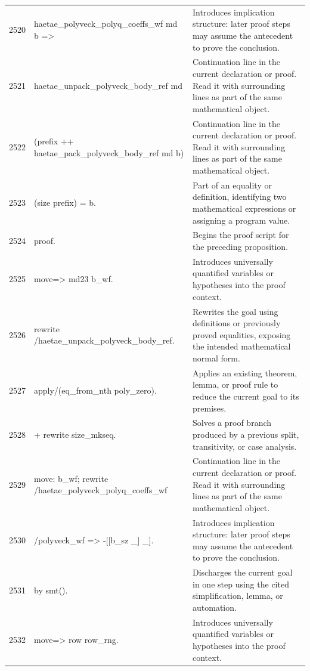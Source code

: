 \documentclass[10pt]{article}
\begin{document}
\begin{longtable}{r L{0.53\textwidth} L{0.37\textwidth}}
2520 & {\ttfamily\scriptsize   haetae\_polyveck\_polyq\_coeffs\_wf md b =>} & Introduces implication structure: later proof steps may assume the antecedent to prove the conclusion. \\
2521 & {\ttfamily\scriptsize   haetae\_unpack\_polyveck\_body\_ref md} & Continuation line in the current declaration or proof.  Read it with surrounding lines as part of the same mathematical object. \\
2522 & {\ttfamily\scriptsize     (prefix ++ haetae\_pack\_polyveck\_body\_ref md b)} & Continuation line in the current declaration or proof.  Read it with surrounding lines as part of the same mathematical object. \\
2523 & {\ttfamily\scriptsize     (size prefix) = b.} & Part of an equality or definition, identifying two mathematical expressions or assigning a program value. \\
2524 & {\ttfamily\scriptsize proof.} & Begins the proof script for the preceding proposition. \\
2525 & {\ttfamily\scriptsize move=> md23 b\_wf.} & Introduces universally quantified variables or hypotheses into the proof context. \\
2526 & {\ttfamily\scriptsize rewrite /haetae\_unpack\_polyveck\_body\_ref.} & Rewrites the goal using definitions or previously proved equalities, exposing the intended mathematical normal form. \\
2527 & {\ttfamily\scriptsize apply/(eq\_from\_nth poly\_zero).} & Applies an existing theorem, lemma, or proof rule to reduce the current goal to its premises. \\
2528 & {\ttfamily\scriptsize   + rewrite size\_mkseq.} & Solves a proof branch produced by a previous split, transitivity, or case analysis. \\
2529 & {\ttfamily\scriptsize     move: b\_wf; rewrite /haetae\_polyveck\_polyq\_coeffs\_wf} & Continuation line in the current declaration or proof.  Read it with surrounding lines as part of the same mathematical object. \\
2530 & {\ttfamily\scriptsize                             /polyveck\_wf => -[[b\_sz \_] \_].} & Introduces implication structure: later proof steps may assume the antecedent to prove the conclusion. \\
2531 & {\ttfamily\scriptsize     by smt().} & Discharges the current goal in one step using the cited simplification, lemma, or automation. \\
2532 & {\ttfamily\scriptsize move=> row row\_rng.} & Introduces universally quantified variables or hypotheses into the proof context. \\

\end{longtable}
\end{document}
